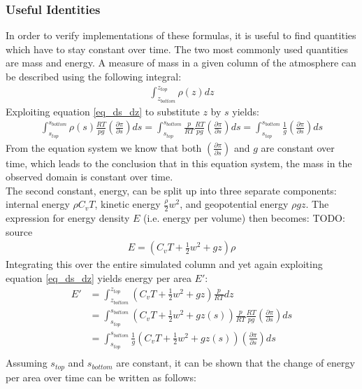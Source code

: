\subsubsection{Useful Identities}
In order to verify implementations of these formulas, it is useful to find quantities which have to stay constant over time.
The two most commonly used quantities are mass and energy.
A measure of mass in a given column of the atmosphere can be described using the following integral:
\begin{align*}
\int_{z_{bottom}}^{z_{top}}\rho(z)dz
\end{align*}
Exploiting equation \ref{eq_ds_dz} to substitute $z$ by $s$ yields:
\begin{align*}
\int_{s_{top}}^{s_{bottom}}\rho(s)\frac{RT}{pg} \left( \frac{\partial \pi}{\partial s} \right) ds = \int_{s_{top}}^{s_{bottom}}\frac{p}{RT}\frac{RT}{pg} \left( \frac{\partial \pi}{\partial s} \right) ds = \int_{s_{top}}^{s_{bottom}}\frac{1}{g}\left( \frac{\partial \pi}{\partial s} \right) ds
\end{align*}
From the equation system we know that both $\left( \frac{\partial \pi}{\partial s} \right)$ and $g$ are constant over time, which leads to the conclusion that in this equation system, the mass in the observed domain is constant over time.
\\
The second constant, energy, can be split up into three separate components: internal energy $\rho C_vT$, kinetic energy $\frac{\rho}{2}w^2$, and geopotential energy $\rho gz$.
The expression for energy density $E$ (i.e. energy per volume) then becomes: TODO: source
\begin{align*}
E = (C_vT+\frac{1}{2}w^2 + gz)\rho
\end{align*}
Integrating this over the entire simulated column and yet again exploiting equation \ref{eq_ds_dz} yields energy per area $E'$:
\begin{align*}
E' &= \int_{z_{bottom}}^{z_{top}} (C_vT+\frac{1}{2}w^2 + gz)\frac{p}{RT} dz\\
&=  \int_{s_{top}}^{s_{bottom}} (C_vT+\frac{1}{2}w^2 + gz(s))\frac{p}{RT}\frac{RT}{pg} \left( \frac{\partial \pi}{\partial s} \right) ds\\
&=  \int_{s_{top}}^{s_{bottom}} \frac{1}{g}(C_vT+\frac{1}{2}w^2 + gz(s)) \left( \frac{\partial \pi}{\partial s} \right) ds\\
\end{align*}
Assuming $s_{top}$ and $s_{bottom}$ are constant, it can be shown that the change of energy per area over time can be written as follows:

